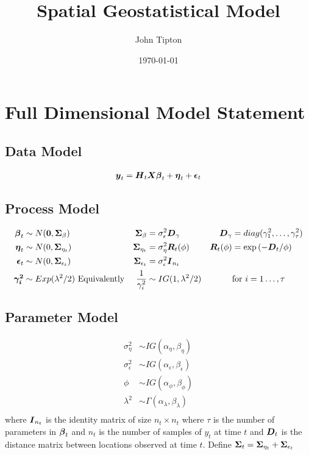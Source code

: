 \documentclass[fleqn]{article}
\title{Spatial Geostatistical Model}
\author{John Tipton}
\date{\today}
\def\bm#1{\mbox{\boldmath $#1$}}
\begin{document}
\maketitle

\section{Full Dimensional Model Statement}
%
\subsection{Data Model}
\begin{align*}
\bm{y}_t & = \bm{H}_t \bm{X} \bm{\beta}_t + \bm{\eta}_t + \bm{\epsilon}_t\\
%
\end{align*}
%
\subsection{Process Model}
%
\begin{align*}
%
\bm{\beta}_t & \sim N(\bm{0}, \bm{\Sigma}_\beta) & \bm{\Sigma}_\beta &  = \sigma^2_\epsilon \bm{D}_\gamma & \bm{D}_\gamma & = diag(\gamma^2_1, \ldots, \gamma^2_\tau)\\
%
\bm{\eta}_t & \sim N(0, \bm{\Sigma}_{\eta_t}) & \bm{\Sigma}_{\eta_t} &  = \sigma^2_\eta \bm{R}_t(\phi) & \bm{R}_t(\phi) & = \exp{ \left( - \bm{D}_t / \phi \right)}\\
%
\bm{\epsilon}_t & \sim N(0, \bm{\Sigma}_{\epsilon_t}) & \bm{\Sigma}_{\epsilon_t} &  = \sigma^2_\epsilon \bm{I}_{n_t}\\
%
\bm{\gamma^2_i} & \sim Exp(\lambda^2 / 2) \mbox{ Equivalently} & \frac{1} {\gamma^2_i} & \sim IG(1, \lambda^2 / 2) & &  \mbox{for } i =1 \ldots, \tau\\
%
\end{align*}
%
\subsection{Parameter Model}
%
\begin{align*}
%
%
%
\sigma^2_\eta & \sim IG(\alpha_\eta, \beta_\eta)\\
%
\sigma^2_\epsilon & \sim IG(\alpha_\epsilon, \beta_\epsilon)\\
%
\phi & \sim IG(\alpha_\phi, \beta_\phi)\\
%
\lambda^2 & \sim \Gamma(\alpha_\lambda, \beta_\lambda)\\
\end{align*}
%
where $\bm{I}_{n_t}$ is the identity matrix of size $n_t \times n_t$ where $\tau$ is the number of parameters in $\bm{\beta}_t$ and $n_t$ is the number of samples of $y_t$ at time $t$ and $\bm{D}_t$ is the distance matrix between locations observed at time $t$. Define $\bm{\Sigma}_t = \bm{\Sigma}_{\eta_t} + \bm{\Sigma}_{\epsilon_t}$
%
\end{document}
